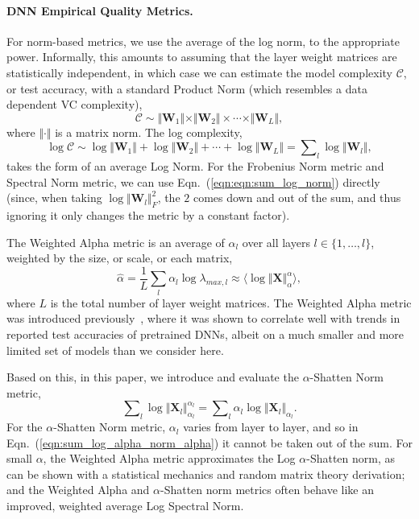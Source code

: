 \documentclass{article}
\begin{document}
\paragraph{DNN Empirical Quality Metrics.}

For norm-based metrics, we use the average of the log norm, to the appropriate power.
Informally, this amounts to assuming that the layer weight matrices are statistically independent, in which case we can estimate the model complexity $\mathcal{C}$, or test accuracy, with a standard Product Norm (which resembles a data dependent VC complexity),
\begin{equation}
\mathcal{C}\sim\Vert\mathbf{W}_{1}\Vert\times\Vert\mathbf{W}_{2}\Vert \times \cdots \times \Vert\mathbf{W}_{L}\Vert ,
\end{equation}
where $\Vert\cdot\Vert$ is a matrix norm.   
The log complexity,
\begin{equation}
\label{eqn:eqn:sum_log_norm}
\log\mathcal{C} \sim \log\Vert\mathbf{W}_{1}\Vert+\log\Vert\mathbf{W}_{2}\Vert + \cdots + \log\Vert\mathbf{W}_{L}\Vert = \sum\nolimits_l \log\Vert\mathbf{W}_{l}\Vert ,
\end{equation}
 takes the form of an average Log Norm.
For the Frobenius Norm metric and Spectral Norm metric, we can use Eqn.~(\ref{eqn:eqn:sum_log_norm}) directly (since, when taking $\log\Vert\mathbf{W}_{l}\Vert_{F}^{2}$, the $2$ comes down and out of the sum, and thus ignoring it only changes the metric by a constant factor).


The Weighted Alpha metric is an average of $\alpha_l$ over all layers $l \in \{1,\ldots,l\}$, weighted by the size, or scale, or each matrix,
\begin{equation}
\hat{\alpha} = \dfrac{1}{L}\sum_l \alpha_l\log\lambda_{max,l}\approx\langle\log\Vert\mathbf{X}\Vert_{\alpha}^{\alpha}\rangle    ,
\end{equation}
where $L$ is the total number of layer weight matrices.
The Weighted Alpha metric was introduced previously~\cite{MM20_SDM}, where it was shown to correlate well with trends in reported test accuracies of pretrained DNNs, albeit on a much smaller and more limited set of models than we consider here.

Based on this, in this paper, we introduce and evaluate the $\alpha$-Shatten Norm metric,
\begin{equation}
\label{eqn:sum_log_alpha_norm_alpha}
\sum\nolimits_l \log \Vert\mathbf{X}_l\Vert_{\alpha_l}^{\alpha_l} 
=
\sum\nolimits_l \alpha_l \log \Vert\mathbf{X}_l\Vert_{\alpha_l} .
\end{equation}
For the $\alpha$-Shatten Norm metric, $\alpha_l$ varies from layer to layer, and so in Eqn.~(\ref{eqn:sum_log_alpha_norm_alpha}) it cannot be taken out of the sum.
For small $\alpha$, the Weighted Alpha metric approximates the Log $\alpha$-Shatten norm, as can be shown with a statistical mechanics and random matrix theory derivation;
and the Weighted Alpha and $\alpha$-Shatten norm metrics often behave like an improved, weighted average Log Spectral Norm.
\end{document}
